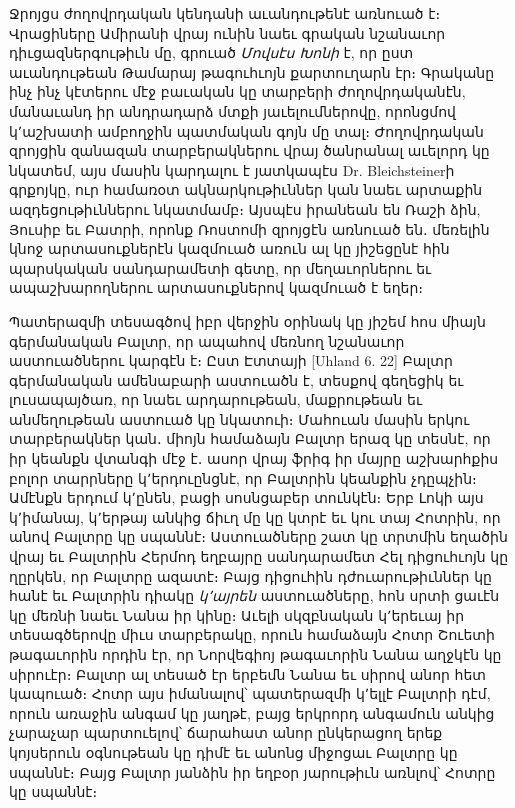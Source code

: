 \documentclass{article}
\begin{document}
{Ջրոյցս ժողովրդական կենդանի աւանդութենէ առնուած է։ Վրացիները Ամիրանի վրայ ունին նաեւ գրական նշանաւոր դիւցազներգութիւն մը, գրուած \emph{Մովսէս Խոնի} է, որ ըստ աւանդութեան Թամարայ թագուհւոյն քարտուղարն էր։ Գրականը ինչ ինչ կէտերու մէջ բաւական կը տարբերի ժողովրդականէն, մանաւանդ իր անդրադարձ մտքի յաւելումներովը, որոնցմով կ՚աշխատի ամբողջին պատմական գոյն մը տալ։ Ժողովրդական զրոյցին զանազան տարբերակներու վրայ ծանրանալ աւելորդ կը նկատեմ, այս մասին կարդալու է յատկապէս Dr. Bleichsteinerի գրքոյկը, ուր համառօտ ակնարկութիւններ կան նաեւ արտաքին ազդեցութիւններու նկատմամբ։ Այսպէս իրանեան են Ռաշի ձին, Յուսիբ եւ Բատրի, որոնք Ռոստոմի զրոյցէն առնուած են․ մեռելին կնոջ արտասուքներէն կազմուած առուն ալ կը յիշեցընէ հին պարսկական սանդարամետի գետը, որ մեղաւորներու եւ ապաշխարողներու արտասուքներով կազմուած է եղեր։

Պատերազմի տեսագծով իբր վերջին օրինակ կը յիշեմ հոս միայն գերմանական Բալտր, որ ապահով մեռնող նշանաւոր աստուածներու կարգէն է։ Ըստ Էտտայի [Uhland 6. 22] Բալտր գերմանական ամենաբարի աստուածն է, տեսքով գեղեցիկ եւ լուսապայծառ, որ նաեւ արդարութեան, մաքրութեան եւ անմեղութեան աստուած կը նկատուի։ Մահուան մասին երկու տարբերակներ կան․ միոյն համաձայն Բալտր երազ կը տեսնէ, որ իր կեանքն վտանգի մէջ է․ ասոր վրայ ֆրիգ իր մայրը աշխարհքիս բոլոր տարրները կ՚երդուընցնէ, որ Բալտրին կեանքին չդըպչին։ Ամէնքն երդում կ՚ընեն, բացի սոսնցաբեր տունկէն։ Երբ Լոկի այս կ՚իմանայ, կ՚երթայ անկից ճիւղ մը կը կտրէ եւ կու տայ Հոտրին, որ անով Բալտրը կը սպաննէ։ Աստուածները շատ կը տրտմին եղածին վրայ եւ Բալտրին Հերմոդ եղբայրը սանդարամետ Հել դիցուհւոյն կը ղըրկեն, որ Բալտրը ազատէ։ Բայց դիցուհին դժուարութիւններ կը հանէ եւ Բալտրին դիակը \emph{կ՚այրեն} աստուածները, հոն սրտի ցաւէն կը մեռնի նաեւ Նանա իր կինը։ Աւելի սկզբնական կ՚երեւայ իր տեսագծերովը միւս տարբերակը, որուն համաձայն Հոտր Շուետի թագաւորին որդին էր, որ Նորվեգիոյ թագաւորին Նանա աղջկէն կը սիրուէր։ Բալտր ալ տեսած էր երբեմն Նանա եւ սիրով անոր հետ կապուած։ Հոտր այս իմանալով՝ պատերազմի կ՚ելլէ Բալտրի դէմ, որուն առաջին անգամ կը յաղթէ, բայց երկրորդ անգամուն անկից չարաչար պարտուելով՝ ճարահատ անոր ընկերացող երեք կոյսերուն օգնութեան կը դիմէ եւ անոնց միջոցաւ Բալտրը կը սպաննէ։ Բայց Բալտր յանձին իր եղբօր յարութիւն առնլով՝ Հոտրը կը սպաննէ։}
\clearpage
\subsection{}
\end{document}
